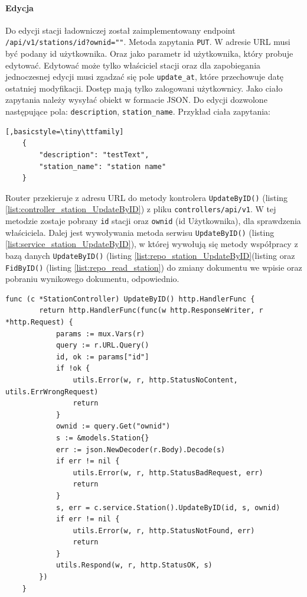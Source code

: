 \paragraph{Edycja\newline}
Do edycji stacji ładowniczej został zaimplementowany endpoint \texttt{/api/v1/stations/{id}?ownid=""}.
Metoda zapytania \texttt{PUT}.
W adresie URL musi być podany id użytkownika. Oraz jako parametr id użytkownika, który probuje edytować. Edytować może tylko właściciel stacji oraz dla zapobiegania jednoczesnej edycji musi zgadzać się pole \texttt{update\_at}, które przechowuje datę ostatniej modyfikacji.
Dostęp mają tylko zalogowani użytkownicy.
Jako ciało zapytania należy wysyłać obiekt w formacie JSON. Do edycji dozwolone następujące pola: \texttt{description}, \texttt{station\_name}.
Przykład ciała zapytania:
\begin{lstlisting}[,basicstyle=\tiny\ttfamily]
    {
		"description": "testText",
		"station_name": "station name"
    }
\end{lstlisting}

Router przekieruje z adresu URL do metody kontrolera \texttt{UpdateByID()} (listing \ref{list:controller_station_UpdateByID}) z pliku \texttt{controllers/api/v1}. W tej metodzie zostaje pobrany \texttt{id} stacji oraz \texttt{ownid} (id Użytkownika), dla sprawdzenia właściciela.
Dalej jest wywoływania metoda serwisu \texttt{UpdateByID()} (listing \ref{list:service_station_UpdateByID}), w której wywołują się metody współpracy z bazą danych \texttt{UpdateByID()} (listing \ref{list:repo_station_UpdateByID}(listing  oraz \texttt{FidByID()} (listing \ref{list:repo_read_station}) do zmiany dokumentu we wpisie oraz pobraniu wynikowego dokumentu, odpowiednio.
\begin{lstlisting}[label=list:controller_station_UpdateByID,caption=Kontroler edycji stacji ładowniczej,basicstyle=\tiny\ttfamily]
    func (c *StationController) UpdateByID() http.HandlerFunc {
        return http.HandlerFunc(func(w http.ResponseWriter, r *http.Request) {
            params := mux.Vars(r)
            query := r.URL.Query()
            id, ok := params["id"]
            if !ok {
                utils.Error(w, r, http.StatusNoContent, utils.ErrWrongRequest)
                return
            }
            ownid := query.Get("ownid")
            s := &models.Station{}
            err := json.NewDecoder(r.Body).Decode(s)
            if err != nil {
                utils.Error(w, r, http.StatusBadRequest, err)
                return
            }
            s, err = c.service.Station().UpdateByID(id, s, ownid)
            if err != nil {
                utils.Error(w, r, http.StatusNotFound, err)
                return
            }
            utils.Respond(w, r, http.StatusOK, s)
        })
    }
\end{lstlisting}


